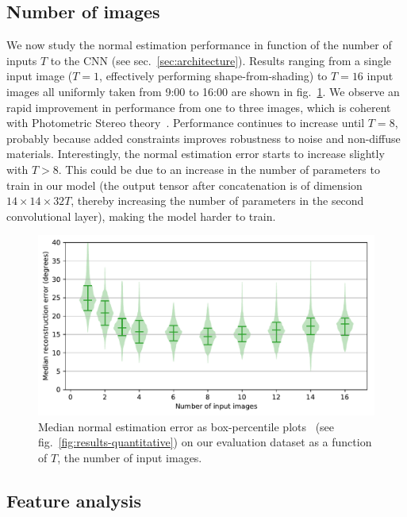 \subsection{Number of images}
\label{sec:ablation_study}

We now study the normal estimation performance in function of the number of inputs $T$ to the CNN (see sec.~\ref{sec:architecture}). Results ranging from a single input image ($T=1$, effectively performing shape-from-shading) to $T=16$ input images all uniformly taken from 9:00 to 16:00 are shown in fig.~\ref{fig:number_of_inputs}. We observe an rapid improvement in performance from one to three images, which is coherent with Photometric Stereo theory~\cite{woodham-opteng-80}. Performance continues to increase until $T=8$, probably because added constraints improves robustness to noise and non-diffuse materials. Interestingly, the normal estimation error starts to increase slightly with $T > 8$. This could be due to an increase in the number of parameters to train in our model (the output tensor after concatenation is of dimension $14 \times 14 \times 32T$, thereby increasing the number of parameters in the second convolutional layer), making the model harder to train.



\begin{figure}[!t]
\centering
\includegraphics[width=0.75\linewidth]{figures/analysis/input_ablation.pdf}
\caption{Median normal estimation error as box-percentile plots~\cite{esty-jss-03} (see fig.~\ref{fig:results-quantitative}) on our evaluation dataset as a function of $T$, the number of input images.}
\label{fig:number_of_inputs}
\end{figure}


\subsection{Feature analysis}

